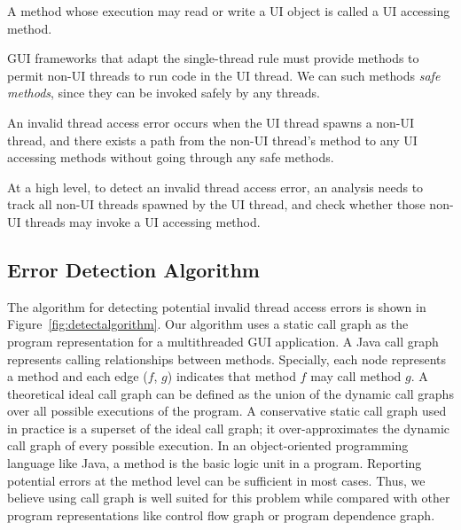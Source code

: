  { A method
whose execution may read or write a UI object is called a UI accessing method.}\vspace{1mm}

 {GUI frameworks that
adapt the single-thread rule must provide methods to permit non-UI threads
to run code in the UI thread. We can such methods \textit{safe methods}, since
they can be invoked safely by any threads.}\vspace{1mm}

 {An invalid
thread access error occurs when the UI thread spawns a non-UI thread, and there
exists a path from the non-UI thread's  method to any UI accessing methods
without going through any safe methods. }\vspace{2mm}

At a high level, to detect an invalid thread access error, an analysis needs to track all
non-UI threads spawned by the UI thread, and check whether those non-UI threads
may invoke a UI accessing method.

\subsection{Error Detection Algorithm}

The algorithm for detecting potential invalid thread access errors
is shown in Figure~\ref{fig:detectalgorithm}. Our algorithm uses a
static call graph as the program representation for a multithreaded
GUI application. A Java call graph represents calling relationships
between methods. Specially, each node represents a method and each
edge ($f$, $g$) indicates that method $f$ may call method $g$.
A theoretical ideal call graph can be defined as the union of the
dynamic call graphs over all possible executions of the program. 
A conservative static call graph used in practice is a superset of
the ideal call graph; it over-approximates the
dynamic call graph of every possible execution. 
In an object-oriented programming language like
Java, a method is the basic logic unit in a program. Reporting
potential errors at the method level can be sufficient in most cases.
Thus, we believe using call graph is well suited for this problem while
compared with other
program representations like control flow graph or program dependence
graph. 


